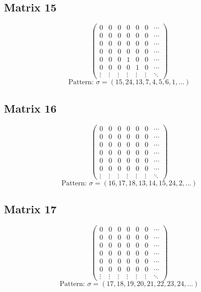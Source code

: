 \documentclass{article}
\begin{document}
\subsection*{Matrix 15}
\[
\begin{pmatrix}
  0 & 0 & 0 & 0 & 0 & 0 & \cdots \\
  0 & 0 & 0 & 0 & 0 & 0 & \cdots \\
  0 & 0 & 0 & 0 & 0 & 0 & \cdots \\
  0 & 0 & 0 & 0 & 0 & 0 & \cdots \\
  0 & 0 & 0 & 1 & 0 & 0 & \cdots \\
  0 & 0 & 0 & 0 & 1 & 0 & \cdots \\
\vdots & \vdots & \vdots & \vdots & \vdots & \vdots & \ddots
\end{pmatrix}
\]
\[
\text{Pattern: } \sigma = (15, 24, 13, 7, 4, 5, 6, 1, \ldots)
\]
\vspace{0.5em}

\subsection*{Matrix 16}
\[
\begin{pmatrix}
  0 & 0 & 0 & 0 & 0 & 0 & \cdots \\
  0 & 0 & 0 & 0 & 0 & 0 & \cdots \\
  0 & 0 & 0 & 0 & 0 & 0 & \cdots \\
  0 & 0 & 0 & 0 & 0 & 0 & \cdots \\
  0 & 0 & 0 & 0 & 0 & 0 & \cdots \\
  0 & 0 & 0 & 0 & 0 & 0 & \cdots \\
\vdots & \vdots & \vdots & \vdots & \vdots & \vdots & \ddots
\end{pmatrix}
\]
\[
\text{Pattern: } \sigma = (16, 17, 18, 13, 14, 15, 24, 2, \ldots)
\]
\vspace{0.5em}

\subsection*{Matrix 17}
\[
\begin{pmatrix}
  0 & 0 & 0 & 0 & 0 & 0 & \cdots \\
  0 & 0 & 0 & 0 & 0 & 0 & \cdots \\
  0 & 0 & 0 & 0 & 0 & 0 & \cdots \\
  0 & 0 & 0 & 0 & 0 & 0 & \cdots \\
  0 & 0 & 0 & 0 & 0 & 0 & \cdots \\
  0 & 0 & 0 & 0 & 0 & 0 & \cdots \\
\vdots & \vdots & \vdots & \vdots & \vdots & \vdots & \ddots
\end{pmatrix}
\]
\[
\text{Pattern: } \sigma = (17, 18, 19, 20, 21, 22, 23, 24, \ldots)
\]
\vspace{0.5em}
\end{document}
